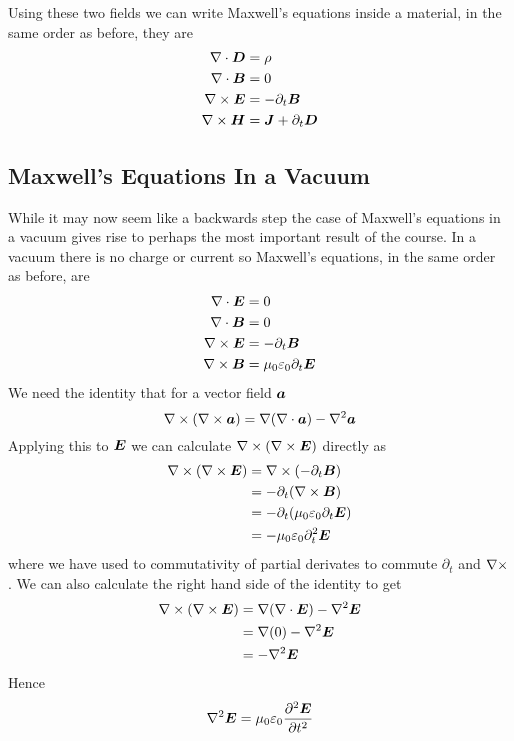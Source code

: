 \documentclass{article}
\begin{document}
    Using these two fields we can write Maxwell's equations inside a material, in the same order as before, they are
    \begin{align*}
        \nabla\cdot\bm{D} &= \rho\\
        \nabla\cdot\bm{B} &= 0\\
        \nabla\times\bm{E} &= -\partial_t\bm{B}\\
        \nabla\times\bm{H} &= \bm{J} + \partial_t\bm{D}
    \end{align*}
    
    \subsection{Maxwell's Equations In a Vacuum}
    While it may now seem like a backwards step the case of Maxwell's equations in a vacuum gives rise to perhaps the most important result of the course.
    In a vacuum there is no charge or current so Maxwell's equations, in the same order as before, are
    \begin{align*}
        \nabla\cdot\bm{E} &= 0\\
        \nabla\cdot\bm{B} &= 0\\
        \nabla\times\bm{E} &= -\partial_t\bm{B}\\
        \nabla\times\bm{B} &= \mu_0\varepsilon_0\partial_t\bm{E}
    \end{align*}
    We need the identity that for a vector field \(\bm{a}\)
    \[\curl(\curl\vv a) = \grad(\div\vv a) - \laplacian\vv a\]
    Applying this to \(\bm{E}\) we can calculate \(\nabla\times(\nabla\times\bm{E})\) directly as
    \begin{align*}
        \nabla\times(\nabla\times\bm{E}) &= \nabla\times(-\partial_t\bm{B})\\
        &= -\partial_t(\nabla\times\bm{B})\\
        &= -\partial_t(\mu_0\varepsilon_0\partial_t\bm{E})\\
        &= -\mu_0\varepsilon_0\partial_t^2\bm{E}
    \end{align*}
    where we have used to commutativity of partial derivates to commute \(\partial_t\) and \(\nabla\times\).
    We can also calculate the right hand side of the identity to get
    \begin{align*}
        \curl(\curl\vv E) &= \grad(\div\vv E) - \laplacian\vv E\\
        &= \grad(0) - \laplacian\vv E\\
        &= -\laplacian\vv E
    \end{align*}
    Hence
    \[\laplacian\vv E = \mu_0\varepsilon_0\pdv[2]{\vv E}{t}\]
\end{document}
